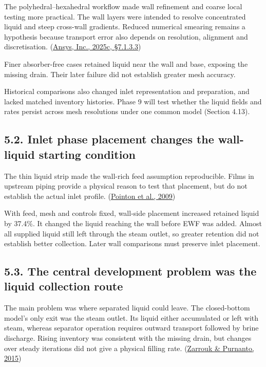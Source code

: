 \documentclass[
  12pt,
  a4paper,
]{article}
\begin{document}
The polyhedral--hexahedral workflow made wall refinement and coarse
local testing more practical. The wall layers were intended to resolve
concentrated liquid and steep cross-wall gradients. Reduced numerical
smearing remains a hypothesis because transport error also depends on
resolution, alignment and discretisation.
(\href{https://ansyshelp.ansys.com/public/Views/Secured/corp/v252/en/flu_ug/flu_ug_GridTypes.html}{Ansys,
Inc., 2025c, §7.1.3.3})

Finer absorber-free cases retained liquid near the wall and base,
exposing the missing drain. Their later failure did not establish
greater mesh accuracy.

Historical comparisons also changed inlet representation and
preparation, and lacked matched inventory histories. Phase 9 will test
whether the liquid fields and rates persist across mesh resolutions
under one common model (Section 4.13).

\subsection{5.2. Inlet phase placement changes the wall-liquid starting
condition}\label{inlet-phase-placement-changes-the-wall-liquid-starting-condition}

The thin liquid strip made the wall-rich feed assumption reproducible.
Films in upstream piping provide a physical reason to test that
placement, but do not establish the actual inlet profile.
(\href{https://publications.mygeoenergynow.org/grc/1028587.pdf}{Pointon
et al., 2009})

With feed, mesh and controls fixed, wall-side placement increased
retained liquid by 37.4\%. It changed the liquid reaching the wall
before EWF was added. Almost all supplied liquid still left through the
steam outlet, so greater retention did not establish better collection.
Later wall comparisons must preserve inlet placement.

\subsection{5.3. The central development problem was the liquid
collection
route}\label{the-central-development-problem-was-the-liquid-collection-route}

The main problem was where separated liquid could leave. The
closed-bottom model's only exit was the steam outlet. Its liquid either
accumulated or left with steam, whereas separator operation requires
outward transport followed by brine discharge. Rising inventory was
consistent with the missing drain, but changes over steady iterations
did not give a physical filling rate.
(\href{https://doi.org/10.1016/j.geothermics.2014.05.009}{Zarrouk \&
Purnanto, 2015})
\end{document}
